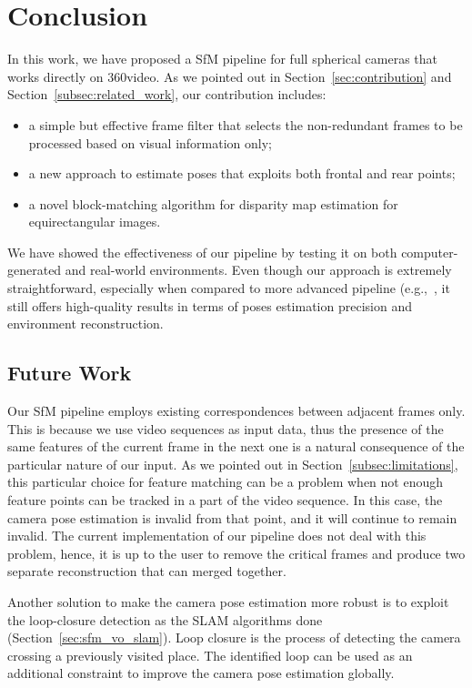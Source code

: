 \chapter{Conclusion}

In this work, we have proposed a SfM pipeline for full spherical cameras that works directly on 360\degree video.
As we pointed out in Section~\ref{sec:contribution} and
Section~\ref{subsec:related_work}, our contribution includes:
%
\begin{itemize}
	\item a simple but effective frame filter that selects the non-redundant frames to be processed based on visual
	information only;
	\item a new approach to estimate poses that exploits both frontal and rear
	points;
	\item a novel block-matching algorithm for disparity map estimation for
	equirectangular images.
\end{itemize}
%
We have showed the effectiveness of our pipeline by testing it on 
both computer-generated and real-world environments.
Even though our approach is extremely straightforward, especially when compared to more advanced pipeline (e.g.,~\cite{schonberger2016structure}, it still offers high-quality results in terms of
poses estimation precision and environment reconstruction.

\section{Future Work}\label{sec:future_work}
Our SfM pipeline employs existing correspondences between adjacent frames only.
This is because we use video sequences as input data, thus the presence of
the same features of the current frame in the next one is a natural consequence
of the particular nature of our input.
As we pointed out in Section~\ref{subsec:limitations}, this particular choice
for feature matching can be a problem when not enough feature points can be
tracked in a part of the video sequence. In this case, the camera pose
estimation is invalid from that point, and it will continue to remain invalid.
The current implementation of our pipeline does not deal with this problem,
hence, it is up to the user to remove the critical frames and produce two
separate reconstruction that can merged together.

Another solution to make the camera pose estimation more robust is to 
exploit the loop-closure detection as the SLAM algorithms done (Section~\ref{sec:sfm_vo_slam}).
Loop closure is the process of detecting the camera crossing a previously
visited place. The identified loop can be used as an additional constraint
to improve the camera pose estimation globally.


